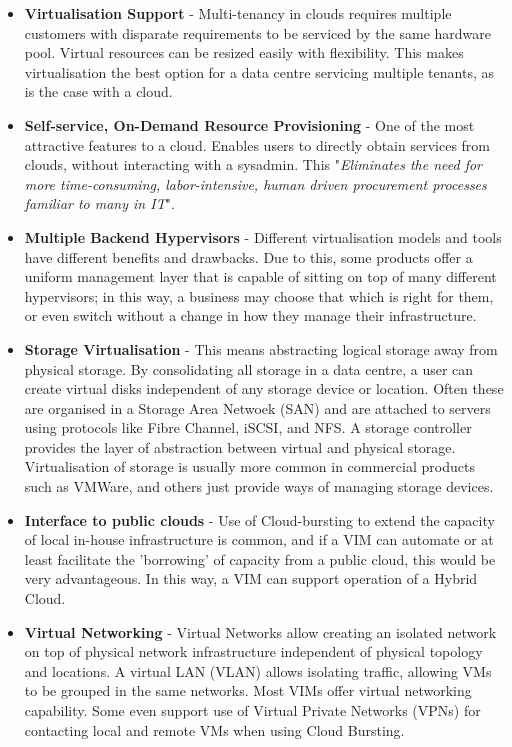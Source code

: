 \begin{itemize}
\itemsep0em
\item \textbf{Virtualisation Support} - Multi-tenancy in clouds requires multiple customers with disparate requirements to be serviced by the same hardware pool. Virtual resources can be resized easily with flexibility. This makes virtualisation the best option for a data centre servicing multiple tenants, as is the case with a cloud.  
\item \textbf{Self-service, On-Demand Resource Provisioning} - One of the most attractive features to a cloud. Enables users to directly obtain services from clouds, without interacting with a sysadmin. This "\textit{Eliminates the need for more time-consuming, labor-intensive, human driven procurement processes familiar to many in IT}"\cite{webspherejournal}.
\item \textbf{Multiple Backend Hypervisors} - Different virtualisation models and tools have different benefits and drawbacks. Due to this, some products offer a uniform management layer that is capable of sitting on top of many different hypervisors; in this way, a business may choose that which is right for them, or even switch without a change in how they manage their infrastructure.  
\item \textbf{Storage Virtualisation} - This means abstracting logical storage away from physical storage. By consolidating all storage in a data centre, a user can create virtual disks independent of any storage device or location. Often these are organised in a Storage Area Netwoek (SAN) and are attached to servers using protocols like Fibre Channel, iSCSI, and NFS. A storage controller provides the layer of abstraction between virtual and physical storage\cite{serverstoragevirtsingh}. Virtualisation of storage is usually more common in commercial products such as VMWare, and others just provide ways of managing storage devices. 
\item \textbf{Interface to public clouds} - Use of Cloud-bursting to extend the capacity of local in-house infrastructure is common, and if a VIM can automate or at least facilitate the 'borrowing' of capacity from a public cloud, this would be very advantageous. In this way, a VIM can support operation of a Hybrid Cloud. 
\item \textbf{Virtual Networking} - Virtual Networks allow creating an isolated network on top of physical network infrastructure independent of physical topology and locations\cite{interconnections}. A virtual LAN (VLAN) allows isolating traffic, allowing VMs to be grouped in the same networks. Most VIMs offer virtual networking capability. Some even support use of Virtual Private Networks (VPNs) for contacting local and remote VMs when using Cloud Bursting. 

\end{itemize}
